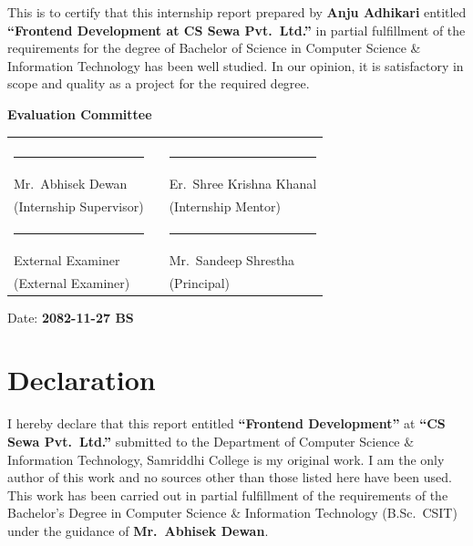 \documentclass[12pt,a4paper]{report}
\begin{document}
This is to certify that this internship report prepared by \textbf{Anju Adhikari} entitled
\textbf{``Frontend Development at CS Sewa Pvt.\ Ltd.''} in partial fulfillment of the
requirements for the degree of Bachelor of Science in Computer Science \& Information
Technology has been well studied. In our opinion, it is satisfactory in scope and quality as
a project for the required degree.

\vspace{0.8cm}
\begin{center}\textbf{Evaluation Committee}\end{center}

\vspace{0.3cm}
\begin{center}
\begin{tabular}{p{6cm} p{1.5cm} p{6cm}}
 & & \\[1.8cm]
\rule{5.5cm}{0.4pt} & & \rule{5.5cm}{0.4pt}\\[2pt]
Mr.\ Abhisek Dewan       & & Er.\ Shree Krishna Khanal\\
(Internship Supervisor)  & & (Internship Mentor)\\[2cm]
\rule{5.5cm}{0.4pt} & & \rule{5.5cm}{0.4pt}\\[2pt]
External Examiner        & & Mr.\ Sandeep Shrestha\\
(External Examiner)      & & (Principal)\\
\end{tabular}
\end{center}
\vfill
\noindent Date: \textbf{2082-11-27 BS}

\newpage
\thispagestyle{empty}
\chapter*{Declaration}

I hereby declare that this report entitled \textbf{``Frontend Development''} at
\textbf{``CS Sewa Pvt.\ Ltd.''} submitted to the Department of Computer Science \&
Information Technology, Samriddhi College is my original work. I am the only author of
this work and no sources other than those listed here have been used. This work has been
carried out in partial fulfillment of the requirements of the Bachelor's Degree in Computer
Science \& Information Technology (B.Sc.\ CSIT) under the guidance of
\textbf{Mr.\ Abhisek Dewan}.
\end{document}
